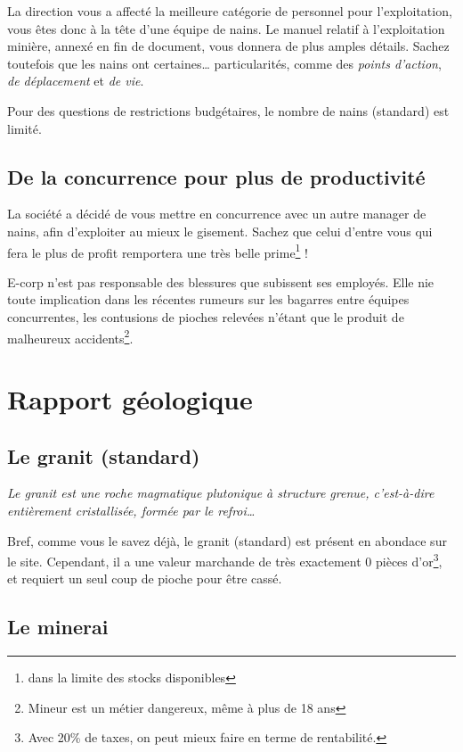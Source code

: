   La direction vous a affecté la meilleure catégorie de personnel pour
  l'exploitation, vous êtes donc à la tête d'une équipe de nains. Le manuel
  relatif à l'exploitation minière, annexé en fin de document, vous donnera de
  plus amples détails. Sachez toutefois que les nains ont certaines\ldots{}
  particularités, comme des \textit{points d'action}, \textit{de déplacement}
  et \textit{de vie}.

  Pour des questions de restrictions budgétaires, le nombre de nains
  (standard) est limité.

\subsection{De la concurrence pour plus de productivité}

  La société a décidé de vous mettre en concurrence avec un autre manager de
  nains, afin d'exploiter au mieux le gisement. Sachez que celui d'entre vous
  qui fera le plus de profit remportera une très belle prime\footnote{dans la
  limite des stocks disponibles} !

  E-corp n'est pas responsable des blessures que subissent ses employés. Elle
  nie toute implication dans les récentes rumeurs sur les bagarres entre
  équipes concurrentes, les contusions de pioches relevées n'étant que le
  produit de malheureux accidents\footnote{Mineur est un métier dangereux,
  même à plus de 18 ans}.

\newpage

\section{Rapport géologique}

\subsection{Le granit (standard)}

  \textit{Le granit est une roche magmatique plutonique à structure grenue,
  c'est-à-dire entièrement cristallisée, formée par le refroi\ldots{}}

  Bref, comme vous le savez déjà, le granit (standard) est présent en abondace
  sur le site. Cependant, il a une valeur marchande de très exactement 0 pièces
  d'or\footnote{Avec 20\% de taxes, on peut mieux faire en terme de
  rentabilité.}, et requiert un seul coup de pioche pour être cassé.

\subsection{Le minerai}

